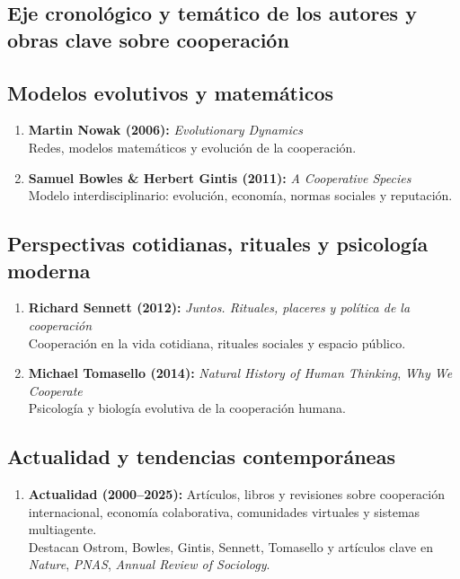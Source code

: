 \documentclass[a4paper,11pt]{article}
\begin{document}
\begin{seccionbox}[naranjasuave]{\section{Eje cronológico y temático de los autores y obras clave sobre cooperación}}
\subsection{Modelos evolutivos y matemáticos}

\begin{enumerate}
    \item \textbf{Martin Nowak (2006):} \textit{Evolutionary Dynamics}\\
    Redes, modelos matemáticos y evolución de la cooperación.
    \item \textbf{Samuel Bowles \& Herbert Gintis (2011):} \textit{A Cooperative Species}\\
    Modelo interdisciplinario: evolución, economía, normas sociales y reputación.
\end{enumerate}

\subsection{Perspectivas cotidianas, rituales y psicología moderna}

\begin{enumerate}
    \item \textbf{Richard Sennett (2012):} \textit{Juntos. Rituales, placeres y política de la cooperación}\\
    Cooperación en la vida cotidiana, rituales sociales y espacio público.
    \item \textbf{Michael Tomasello (2014):} \textit{Natural History of Human Thinking}, \textit{Why We Cooperate}\\
    Psicología y biología evolutiva de la cooperación humana.
\end{enumerate}

\subsection{Actualidad y tendencias contemporáneas}

\begin{enumerate}
    \item \textbf{Actualidad (2000–2025):} Artículos, libros y revisiones sobre cooperación internacional, economía colaborativa, comunidades virtuales y sistemas multiagente.\\
    Destacan Ostrom, Bowles, Gintis, Sennett, Tomasello y artículos clave en \textit{Nature}, \textit{PNAS}, \textit{Annual Review of Sociology}.
\end{enumerate}


    
\end{seccionbox}
\end{document}
